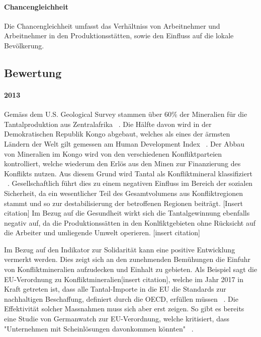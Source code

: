 \paragraph{Chancengleichheit}

Die Chancengleichheit umfasst das Verhältniss von Arbeitnehmer und
Arbeitnehmer in den Produktionsstätten, sowie den Einfluss auf die lokale
Bevölkerung.

\subsection{Bewertung}

\paragraph{2013} Gemäss dem U.S. Geological Survey stammen über 60\% der Mineralien für die
Tantalproduktion aus Zentralafrika ~\cite{USGSMine8}. Die Hälfte davon
wird in der Demokratischen Republik Kongo abgebaut, welches als eines der ärmsten
Ländern der Welt gilt gemessen am Human Development Index ~\cite{UNDProgramme2018}. Der Abbau von Mineralien im
Kongo wird von den verschiedenen Konfliktparteien kontrolliert, welche wiederum
den Erlös aus den Minen zur Finanzierung des Konflikts nutzen. Aus diesem Grund
wird Tantal als Konfliktmineral klassifiziert ~\cite{doevenspeck2012konfliktmineralien}.
Gesellschaftlich führt dies zu einem negativen Einfluss im Bereich der sozialen
Sicherheit, da ein wesentlicher Teil des Gesamtvolumens aus Konfliktregionen
stammt und so zur destabilisierung der betroffenen Regionen beiträgt. [Insert citation]
Im Bezug auf die Gesundheit wirkt sich die Tantalgewinnung ebenfalls negativ auf, da die 
Produktionssätten in den Konlfiktgebieten ohne Rücksicht auf die Arbeiter und umliegende Umwelt
operieren. [insert citation]

Im Bezug auf den Indikator zur Solidarität kann eine positive Entwicklung vermerkt werden.
Dies zeigt sich an den zunehmenden Bemühungen die Einfuhr von Konfliktmineralien 
aufzudecken und Einhalt zu gebieten. Als Beispiel sagt die EU-Verordnung zu Konfliktmineralien[insert citation], 
welche im Jahr 2017 in Kraft getreten ist, dass alle Tantal-Importe in die EU die Standards zur nachhaltigen Beschaffung, 
definiert durch die OECD, erfüllen müssen ~\cite{europeancommission}. Die Effektivität solcher 
Massnahmen muss sich aber erst zeigen. So gibt es bereits eine Studie von Germanwatch zur EU-Verordnung, 
welche kritisiert, dass "Unternehmen mit Scheinlösungen davonkommen könnten" ~\cite{Governan35}.

